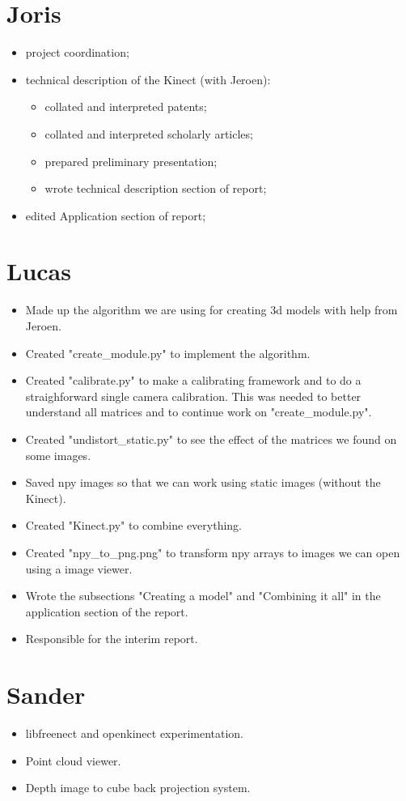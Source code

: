 \section*{Joris}
\begin{itemize}
    \item project coordination;
    \item technical description of the Kinect (with Jeroen):
    \begin{itemize}
        \item collated and interpreted patents;
        \item collated and interpreted scholarly articles;
        \item prepared preliminary presentation;
        \item wrote technical description section of report;
    \end{itemize}
    \item edited Application section of report;
\end{itemize}

\section*{Lucas}
\begin{itemize}
\item Made up the algorithm we are using for creating 3d models with help from Jeroen.
\item Created "create\_module.py" to implement the algorithm.
\item Created "calibrate.py" to make a calibrating framework and to do a 
straighforward single camera calibration. This was needed to better understand 
all matrices and to continue work on "create\_module.py".
\item Created "undistort\_static.py" to see the effect of the matrices we found on some images.
\item Saved npy images so that we can work using static images (without the Kinect).
\item Created "Kinect.py" to combine everything.
\item Created "npy\_to\_png.png" to transform npy arrays to images we can open 
using a image viewer.
\item Wrote the subsections "Creating a model" and "Combining it all" in the 
application section of the report.
\item Responsible for the interim report.
\end{itemize}

\section*{Sander}
\begin{itemize}
    \item libfreenect and openkinect experimentation.
    \item Point cloud viewer.
    \item Depth image to cube back projection system.
\end{itemize}
